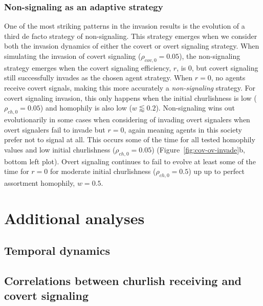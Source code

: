 \documentclass[11pt,letterpaper]{article}
\begin{document}
\subsubsection{Non-signaling as an adaptive strategy}

One of the most striking patterns in the invasion results is the evolution
of a third de facto strategy of non-signaling. This strategy emerges when
we consider both the invasion dynamics of either the covert or overt 
signaling strategy. When simulating the invasion of covert signaling
($\rho_{cov,0}=0.05$), the non-signaling strategy emerges when the covert
signaling efficiency, $r$, is 0, but covert signaling still successfully
invades as the chosen agent strategy. When $r=0$, no agents receive
covert signals, making this more accurately a \emph{non-signaling} strategy.  
For covert signaling invasion, this only happens when the initial churlishness
is low ($\rho_{ch,0}=0.05$) and homophily is also low ($w \lessapprox 0.2$). 
Non-signaling wins out evolutionarily 
in some cases when considering of invading overt signalers when overt signalers
fail to invade but $r=0$, again meaning agents in this society prefer not
to signal at all. This occurs some of the time for all tested homophily
values and low initial churlishness ($\rho_{ch,0}=0.05$) (Figure~\ref{fig:cov-ov-invade}b, bottom left plot).  
Overt signaling continues to fail to evolve at least some of the time
for $r=0$ for moderate initial churlishness ($\rho_{ch,0}=0.5$) up up to perfect 
assortment homophily, $w=0.5$.

% 


% 

\appendix

\section{Additional analyses}

\subsection{Temporal dynamics}

\subsection{Correlations between churlish receiving and covert signaling}
\end{document}
